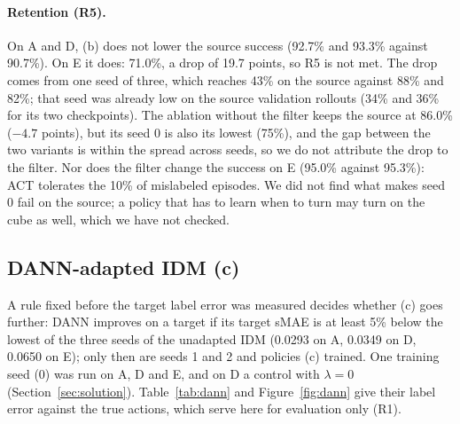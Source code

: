 \documentclass{article}
\begin{document}
\paragraph{Retention (R5).}
On A and D, (b) does not lower the source success (92.7\% and 93.3\% against 90.7\%). On E
it does: 71.0\%, a drop of 19.7 points, so R5 is not met. The drop comes from one seed of
three, which reaches 43\% on the source against 88\% and 82\%; that seed was already low
on the source validation rollouts (34\% and 36\% for its two checkpoints). The ablation
without the filter keeps the source at 86.0\% ($-4.7$ points), but its seed 0 is also its
lowest (75\%), and the gap between the two variants is within the spread across seeds, so
we do not attribute the drop to the filter. Nor does the filter change the success on E
(95.0\% against 95.3\%): ACT tolerates the 10\% of mislabeled episodes. We did not find
what makes seed 0 fail on the source; a policy that has to learn when to turn may turn on
the cube as well, which we have not checked.

\subsection{DANN-adapted IDM (c)}
\label{sec:dann}
A rule fixed before the target label error was measured decides whether (c) goes further:
DANN improves on a target if its target sMAE is at least 5\% below the lowest of the three
seeds of the unadapted IDM (0.0293 on A, 0.0349 on D, 0.0650 on E); only then are seeds 1
and 2 and policies (c) trained. One training seed (0) was run on A, D and E, and on D a
control with $\lambda = 0$ (Section~\ref{sec:solution}). Table~\ref{tab:dann} and
Figure~\ref{fig:dann} give their label error against the true actions, which serve here
for evaluation only (R1).
\end{document}
